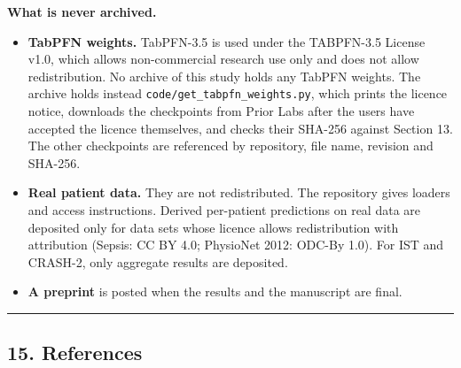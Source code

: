 \documentclass[
  10pt,
]{article}
\providecommand{\tightlist}{%
  \setlength{\itemsep}{0pt}\setlength{\parskip}{0pt}}
\begin{document}
\textbf{What is never archived.}

\begin{itemize}
\tightlist
\item
  \textbf{TabPFN weights.} TabPFN-3.5 is used under the
  TABPFN-3.5 License v1.0, which allows non-commercial
  research use only and does not allow redistribution. No
  archive of this study holds any TabPFN weights. The
  archive holds instead
  \texttt{code/get\_tabpfn\_weights.py}, which prints the
  licence notice, downloads the checkpoints from Prior Labs
  after the users have accepted the licence themselves, and
  checks their SHA-256 against Section 13. The other
  checkpoints are referenced by repository, file name,
  revision and SHA-256.
\item
  \textbf{Real patient data.} They are not redistributed.
  The repository gives loaders and access instructions.
  Derived per-patient predictions on real data are deposited
  only for data sets whose licence allows redistribution
  with attribution (Sepsis: CC BY 4.0; PhysioNet 2012:
  ODC-By 1.0). For IST and CRASH-2, only aggregate results
  are deposited.
\item
  \textbf{A preprint} is posted when the results and the
  manuscript are final.
\end{itemize}

\begin{center}\rule{0.5\linewidth}{0.5pt}\end{center}

\subsection{15. References}\label{references}
\end{document}
